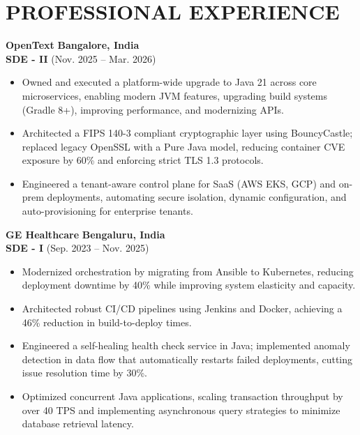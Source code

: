 \documentclass[a4paper,10pt]{article}
\begin{document}
\vspace{0.1in}
\section*{PROFESSIONAL EXPERIENCE}

\textbf{OpenText} \hfill \textbf{Bangalore, India} \\
\textbf{SDE - II} \hfill (Nov. 2025 – Mar. 2026)
\begin{itemize}
    \item Owned and executed a platform-wide upgrade to Java 21 across core microservices, enabling modern JVM features, upgrading build systems (Gradle 8+), improving performance, and modernizing APIs.
    \item Architected a FIPS 140-3 compliant cryptographic layer using BouncyCastle; replaced legacy OpenSSL with a Pure Java model, reducing container CVE exposure by 60\% and enforcing strict TLS 1.3 protocols.
    \item Engineered a tenant-aware control plane for SaaS (AWS EKS, GCP) and on-prem deployments, automating secure isolation, dynamic configuration, and auto-provisioning for enterprise tenants.
\end{itemize}

\vspace{0.05in}
\textbf{GE Healthcare} \hfill \textbf{Bengaluru, India} \\
\textbf{SDE - I} \hfill (Sep. 2023 – Nov. 2025)
\begin{itemize}
    \item Modernized orchestration by migrating from Ansible to Kubernetes, reducing deployment downtime by 40\% while improving system elasticity and capacity.
    \item Architected robust CI/CD pipelines using Jenkins and Docker, achieving a 46\% reduction in build-to-deploy times.
    \item Engineered a self-healing health check service in Java; implemented anomaly detection in data flow that automatically restarts failed deployments, cutting issue resolution time by 30\%.
    \item Optimized concurrent Java applications, scaling transaction throughput by over 40 TPS and implementing asynchronous query strategies to minimize database retrieval latency.
\end{itemize}
\end{document}
